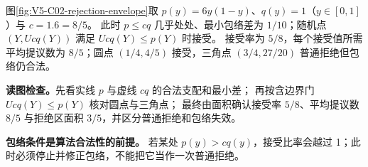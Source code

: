 \documentclass[UTF8,a4paper,11pt,openany]{ctexbook}
\begin{document}
\setcounter{page}{576}
\setcounter{chapter}{31}
\setcounter{figure}{3}
\pagestyle{headings}
图\ref{fig:V5-C02-rejection-envelope}取 $p(y)=6y(1-y)$、$q(y)=1$（$y\in[0,1]$）与 $c=1.6=8/5$。
此时 $p\le cq$ 几乎处处、最小包络差为 $1/10$；随机点 $(Y,Ucq(Y))$ 满足 $Ucq(Y)\le p(Y)$ 时接受。
接受率为 $5/8$，每个接受值所需平均提议数为 $8/5$；圆点 $(1/4,4/5)$ 接受，三角点 $(3/4,27/20)$ 普通拒绝但包络仍合法。

\FloatBarrier
\noindent\textbf{读图检查。}先看实线 $p$ 与虚线 $cq$ 的合法支配和最小差；
再按含边界门 $Ucq(Y)\le p(Y)$ 核对圆点与三角点；
最终由面积确认接受率 $5/8$、平均提议数 $8/5$ 与拒绝区面积 $3/5$，并区分普通拒绝和包络失效。
\begin{comparisonbox}
\textbf{包络条件是算法合法性的前提。} 若某处 $p(y)>cq(y)$，接受比率会越过 1；此时必须停止并修正包络，不能把它当作一次普通拒绝。
\end{comparisonbox}
\end{document}
